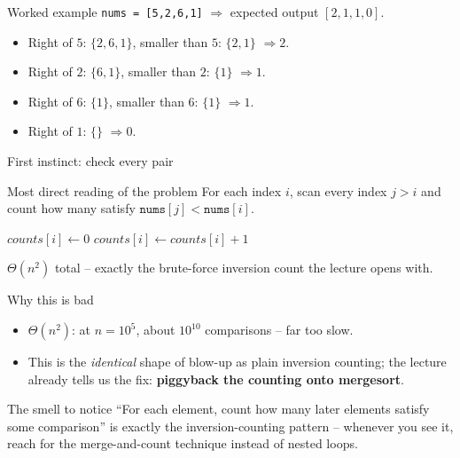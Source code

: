 \documentclass[11pt,aspectratio=169]{beamer}
\begin{document}
\begin{frame}{Worked example}
  \small
  \texttt{nums = [5,2,6,1]} $\Rightarrow$ expected output $[2,1,1,0]$.
  \begin{itemize}
    \item Right of $5$: $\{2,6,1\}$, smaller than $5$: $\{2,1\}$ $\Rightarrow 2$.
    \item Right of $2$: $\{6,1\}$, smaller than $2$: $\{1\}$ $\Rightarrow 1$.
    \item Right of $6$: $\{1\}$, smaller than $6$: $\{1\}$ $\Rightarrow 1$.
    \item Right of $1$: $\{\}$ $\Rightarrow 0$.
  \end{itemize}
\end{frame}

\begin{frame}{First instinct: check every pair}
  \begin{block}{Most direct reading of the problem}
    For each index $i$, scan every index $j > i$ and count how many satisfy
    $\texttt{nums}[j] < \texttt{nums}[i]$.
  \end{block}
  \begin{algorithmic}[1]
      \State $counts[i] \gets 0$
         \State $counts[i] \gets counts[i] + 1$ \EndIf
      \EndFor
    \EndFor
  \end{algorithmic}
  $\Theta(n^2)$ total -- exactly the brute-force inversion count the lecture opens with.
\end{frame}

\begin{frame}{Why this is bad}
  \begin{itemize}
    \item $\Theta(n^2)$: at $n = 10^5$, about $10^{10}$ comparisons -- far too slow.
    \item This is the \emph{identical} shape of blow-up as plain inversion counting; the
    lecture already tells us the fix: \textbf{piggyback the counting onto mergesort}.
  \end{itemize}
  \begin{alertblock}{The smell to notice}
    ``For each element, count how many later elements satisfy some comparison'' is exactly
    the inversion-counting pattern -- whenever you see it, reach for the merge-and-count
    technique instead of nested loops.
  \end{alertblock}
\end{frame}
\end{document}
